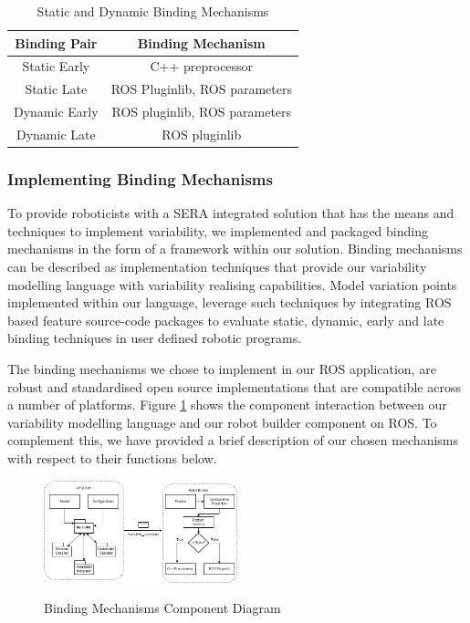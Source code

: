 \documentclass[conference]{IEEEtran}
\begin{document}
\begin{table}[htbp]
	\caption{Static and Dynamic Binding Mechanisms}
	\begin{center}
		\begin{tabular}{|c|c|}
			\hline
			Binding Pair & Binding Mechanism \\ \hline
			Static Early & C++ preprocessor \\ \hline
			Static Late &  ROS Pluginlib, ROS parameters  \\ \hline
			Dynamic Early &  ROS pluginlib, ROS parameters  \\ \hline
			Dynamic Late &  ROS pluginlib  \\ \hline
			
		\end{tabular}
		\label{tab:realmecha}
	\end{center}
\end{table}


\subsubsection{Implementing Binding Mechanisms}
To provide roboticists with a SERA integrated solution that has the means
and techniques to implement variability, we implemented and packaged binding mechanisms in the form of a framework within our solution. Binding mechanisms can be described as implementation techniques that provide our variability modelling language with variability realising capabilities. Model variation points implemented within our language, leverage such techniques by integrating ROS based feature source-code packages to evaluate static, dynamic, early and late binding techniques in user defined robotic programs.

The binding mechanisms we chose to implement in our ROS application, are robust and standardised open source implementations that are compatible across a number of platforms. Figure \ref{mecha-compo} shows the component interaction between our variability modelling language and our robot builder component on ROS. To complement this, we have provided a brief description of our chosen mechanisms with respect to their functions below.

\begin{figure}[H]
	\caption{Binding Mechanisms Component Diagram}
	\centering
	\includegraphics[width=0.5\textwidth]{diagrams/mecha-compo.png}
	\label{mecha-compo}
\end{figure}
\end{document}
